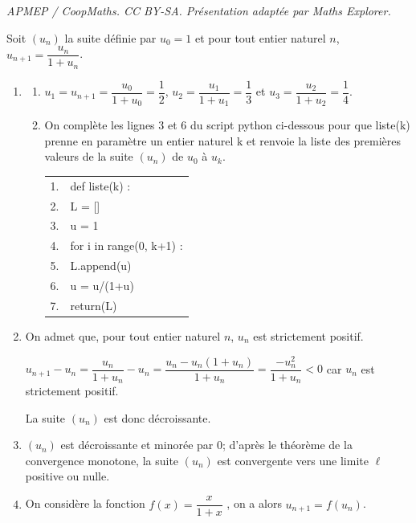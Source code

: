 \documentclass[10pt]{article}
\providecommand{\blue}{\color{blue}}
\providecommand{\blue}{\color{blue}}
\begin{document}
\noindent\textit{APMEP / CoopMaths. CC BY-SA. Présentation adaptée par Maths Explorer.}\par\medskip
\medskip

Soit $\left(u_n\right)$ la suite définie par $u_0 = 1$ et pour tout entier naturel $n$, \: 
$u_{n+1} = \dfrac{u_n}{1 + u_n}$.

\begin{enumerate}

\item 
	\begin{enumerate}
		\item $u_1=u_{n+1} = \dfrac{u_0}{1 + u_0}=\dfrac{1}{2}$, $u_2 = \dfrac{u_1}{1 + u_1}=\dfrac{1}{3}$  et $u_3 = \dfrac{u_2}{1 + u_2} = \dfrac{1}{4}$.


		\item On complète les lignes 3 et 6 du script python ci-dessous pour que liste(k) prenne en paramètre un entier naturel k et renvoie la liste des premières valeurs de la suite $\left(u_n\right)$ de $u_0$ à $u_k$.

\begin{center}
\begin{tabularx}{0.5\linewidth}{|l|X|}\hline
1.&def liste(k) :\\
2.&\qquad L = []\\
3.&\qquad u = {\blue 1}\\
4.&\qquad for i in range(0, k+1) :\\
5.&\quad \qquad L.append(u)\\
6.&\quad \qquad u = {\blue u/(1+u)}\\
7.&\qquad return(L)\\ \hline
\end{tabularx}
\end{center}
	\end{enumerate}
\item On admet que, pour tout entier naturel $n$, $u_n$ est strictement positif.

$u_{n+1} - u_n= \dfrac{u_n}{1 + u_n}-u_n=\dfrac{u_n-u_n(1+u_n)}{1+u_n}=\dfrac{-u_n^2}{1+u_n}<0$ car $u_n$ est strictement positif.

La suite $(u_n)$ est donc décroissante.

\item 
$\left(u_n\right) $ est décroissante et minorée par $0$; d'après le théorème de la convergence monotone, la suite  $(u_n)$ est convergente vers une limite $\ell$ positive ou nulle.

\item 
On considère la fonction $f(x)=\dfrac{x}{1+x}$ , on a alors $u_{n+1} = f\left(u_n\right)$.


\end{enumerate}
\end{document}
